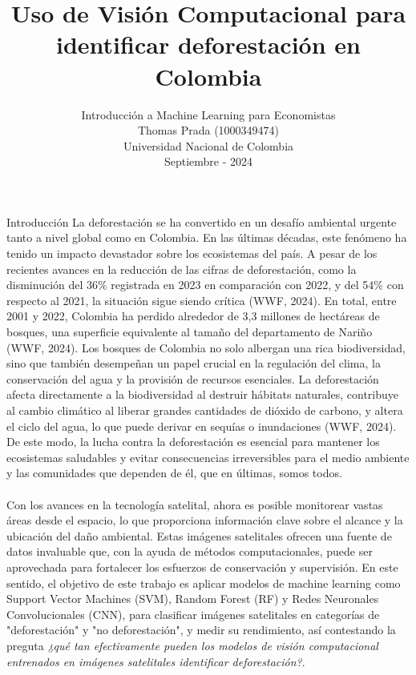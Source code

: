 \documentclass[11pt]{article}
\title{Uso de Visión Computacional para \\ identificar deforestación en Colombia}
\author{Introducción a Machine Learning para Economistas \\ Thomas Prada (1000349474)\\ Universidad Nacional de Colombia \\Septiembre - 2024}
\date{}
\begin{document}
\maketitle

\begin{section}{Introducción}
La deforestación se ha convertido en un desafío ambiental urgente tanto a nivel global como en Colombia. En las últimas décadas, este fenómeno ha tenido un impacto devastador sobre los ecosistemas del país. A pesar de los recientes avances en la reducción de las cifras de deforestación, como la disminución del 36\% registrada en 2023 en comparación con 2022, y del 54\% con respecto al 2021, la situación sigue siendo crítica (WWF, 2024). En total, entre 2001 y 2022, Colombia ha perdido alrededor de 3,3 millones de hectáreas de bosques, una superficie equivalente al tamaño del departamento de Nariño (WWF, 2024). Los bosques de Colombia no solo albergan una rica biodiversidad, sino que también desempeñan un papel crucial en la regulación del clima, la conservación del agua y la provisión de recursos esenciales. La deforestación afecta directamente a la biodiversidad al destruir hábitats naturales, contribuye al cambio climático al liberar grandes cantidades de dióxido de carbono, y altera el ciclo del agua, lo que puede derivar en sequías o inundaciones (WWF, 2024). De este modo, la lucha contra la deforestación es esencial para mantener los ecosistemas saludables y evitar consecuencias irreversibles para el medio ambiente y las comunidades que dependen de él, que en últimas, somos todos.
\\
\\
Con los avances en la tecnología satelital, ahora es posible monitorear vastas áreas desde el espacio, lo que proporciona información clave sobre el alcance y la ubicación del daño ambiental. Estas imágenes satelitales ofrecen una fuente de datos invaluable que, con la ayuda de métodos computacionales, puede ser aprovechada para fortalecer los esfuerzos de conservación y supervisión. En este sentido, el objetivo de este trabajo es aplicar modelos de machine learning como Support Vector Machines (SVM), Random Forest (RF) y Redes Neuronales Convolucionales (CNN), para clasificar imágenes satelitales en categorías de "deforestación" y "no deforestación", y medir su rendimiento, así contestando la preguta \textit{¿qué tan efectivamente pueden los modelos de visión computacional entrenados en imágenes satelitales identificar deforestación?}. 
\end{section}
\end{document}
